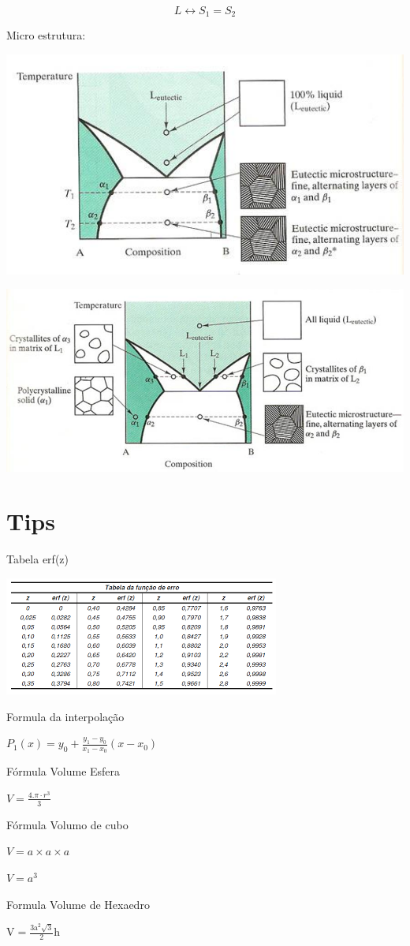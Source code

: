 \begin{equation}\label{key}
L \leftrightarrow S_{1} = S_{2}
\end{equation}

Micro estrutura:

\includegraphics[scale=0.4,trim={0 0 0 0}]{figures/microEute}

\includegraphics[scale=0.4,trim={0 0 0 0}]{figures/microEute2}




\section{Tips}

Tabela erf(z)

\includegraphics[scale=1,trim={0 0 0 0}]{figures/erf}

Formula da interpolação

$P_{1}(x)=y_{0}+\frac{y_{1}-y_{0}}{x_{1}-x_{0}}\left(x-x_{0}\right)$


Fórmula Volume Esfera

$V=\frac{4 . \pi \cdot r^{3}}{3}$

Fórmula Volumo de cubo

$V=a \times a \times a$

$V=a^{3}$

Formula Volume de Hexaedro

$\mathrm{V}=\frac{3 \mathrm{a}^{2} \sqrt{3}}{2} \mathrm{h}$

